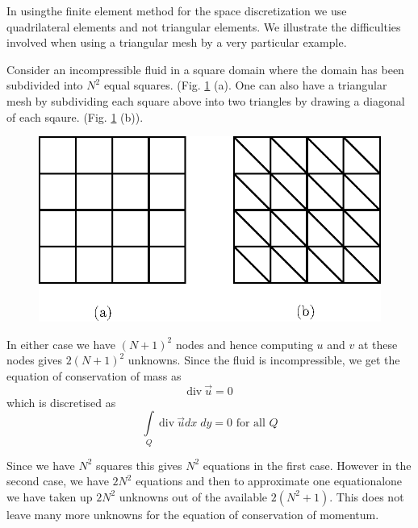 \begin{remark}\label{chap11:rem11.5}
In using\pageoriginale the finite element method for the space discretization we use quadrilateral elements and not triangular elements. We illustrate the difficulties involved when using a triangular mesh by a very particular example.

Consider an incompressible fluid in a square domain where the domain
has been subdivided into $N^2$ equal squares. (Fig. \ref{c11:fig11.4}
(a). One can 
also have a triangular mesh by subdividing each square above into two
triangles by drawing a diagonal of each sqaure. (Fig. \ref{c11:fig11.4} (b)).  

\begin{figure}[H]
\centering
\includegraphics{figures/fig52-11.4.eps}
\caption{}\label{c11:fig11.4}
\end{figure}

In either case we have $(N+1)^2$ nodes and hence computing $u$ and $v$
at these nodes gives $2(N+1)^2$ unknowns. Since the fluid is
incompressible, we get the equation of conservation of mass as 
\begin{equation*}
\text{div}~ \vec{u} = 0\tag{11.53}\label{eq11.53}
\end{equation*}
which is discretised as 
\begin{equation*}
\int\limits_Q ~\text{div}~ \vec{u} dx \; dy = 0 \text{ for all } Q
\tag{11.54}\label{eq11.54} 
\end{equation*}

Since we have $N^2$ squares this gives $N^2$ equations in the first case. However in the second case, we have $2N^2$ equations and then to approximate one equation\pageoriginale alone we have taken up $2N^2$ unknowns out of the available $2 (N^2+1)$. This does not leave many more unknowns for the equation of conservation of momentum.


\end{remark}
